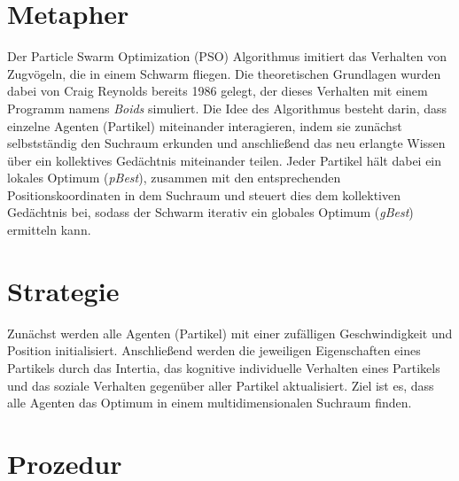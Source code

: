 
\section{Metapher}

Der Particle Swarm Optimization (PSO) Algorithmus imitiert das Verhalten von
Zugvögeln, die in einem Schwarm fliegen. Die theoretischen Grundlagen wurden
dabei von Craig Reynolds bereits 1986 gelegt, der dieses Verhalten mit einem
Programm namens \emph{Boids} simuliert. Die Idee des Algorithmus besteht darin,
dass einzelne Agenten (Partikel) miteinander interagieren, indem sie zunächst
selbstständig den Suchraum erkunden und anschließend das neu erlangte Wissen
über ein kollektives Gedächtnis miteinander teilen. Jeder Partikel hält dabei
ein lokales Optimum (\emph{pBest}), zusammen mit den entsprechenden
Positionskoordinaten in dem Suchraum und steuert dies dem kollektiven
Gedächtnis bei, sodass der Schwarm iterativ ein globales Optimum (\emph{gBest})
ermitteln kann.

\section{Strategie}

Zunächst werden alle Agenten (Partikel) mit einer zufälligen Geschwindigkeit
und Position initialisiert. Anschließend werden die jeweiligen Eigenschaften
eines Partikels durch das Intertia, das kognitive individuelle Verhalten eines
Partikels und das soziale Verhalten gegenüber aller Partikel aktualisiert. Ziel
ist es, dass alle Agenten das Optimum in einem multidimensionalen Suchraum
finden.

\section{Prozedur}

